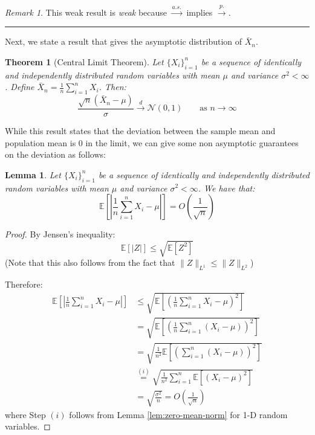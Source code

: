 \documentclass{article}
\newtheorem{theorem}{Theorem}[subsection]
\newtheorem{lemma}{Lemma}[subsection]
\theoremstyle{remark}
\newtheorem*{remark}{Remark}
\newcommand{\comprule}{\textcolor[RGB]{220,220,220}{\rule{\linewidth}{0.2pt}}}
\newcommand{\Exp}{\mathbb{E}}
\newcommand{\calN}{\mathcal{N}}
\begin{document}
\begin{remark}
This weak result is \emph{weak} because \(\xrightarrow{a.s.}\) implies \(\xrightarrow{p.}\).
\end{remark}

\comprule

Next, we state a result that gives the asymptotic distribution of \(\bar{X}_{n}\).
\begin{theorem}[Central Limit Theorem]
\label{thm:clt}
Let \(\{X_{i}\}_{i=1}^{n}\) be a sequence of identically and independently distributed random variables with mean \(\mu\) and variance \(\sigma^{2} < \infty\). Define \(\bar{X}_{n} = \frac{1}{n}\sum\limits_{i=1}^{n} X_{i}\). Then:
\begin{equation*}
\frac{\sqrt{n}(\bar{X}_{n} - \mu)}{\sigma} \xrightarrow{d} \calN(0, 1) \qquad \text{as } n \to \infty
\end{equation*}
\end{theorem}

While this result states that the deviation between the sample mean and population mean is 0 in the limit, we can give some non asymptotic guarantees on the deviation as follows:
\begin{lemma}
Let \(\{X_{i}\}_{i=1}^{n}\) be a sequence of identically and independently distributed random variables with mean \(\mu\) and variance \(\sigma^{2} < \infty\). We have that:
\begin{equation*}
\Exp\left[\left|\frac{1}{n}\sum_{i=1}^{n}X_{i} - \mu\right|\right] = O\left(\frac{1}{\sqrt{n}}\right)
\end{equation*}
\end{lemma}

\begin{proof}
By Jensen's inequality:
\begin{equation*}
\Exp\left[|Z|\right] \leq \sqrt{\Exp\left[Z^{2}\right]}
\end{equation*}
(Note that this also follows from the fact that \(\|Z\|_{L^{1}} \leq \|Z\|_{L^{2}}\))

Therefore:
\begin{align*}
\Exp\left[\left|\frac{1}{n}\sum_{i=1}^{n}X_{i} - \mu\right|\right] &\leq \sqrt{\Exp\left[\left(\frac{1}{n}\sum_{i=1}^{n}X_{i} - \mu\right)^{2}\right]} \\
&= \sqrt{\Exp\left[\left(\frac{1}{n}\sum_{i=1}^{n}(X_{i} - \mu)\right)^{2}\right]} \\
&= \sqrt{\frac{1}{n^{2}}\Exp\left[\left(\sum_{i=1}^{n}(X_{i} - \mu)\right)^{2}\right]} \\
&\overset{(i)}= \sqrt{\frac{1}{n^{2}}\sum_{i=1}^{n}\Exp\left[(X_{i} - \mu)^{2}\right]} \\
&= \sqrt{\frac{\sigma^{2}}{n}} = O\left(\frac{1}{\sqrt{n}}\right)
\end{align*}
where Step \((i)\) follows from Lemma \ref{lem:zero-mean-norm} for 1-D random variables.
\end{proof}
\end{document}
